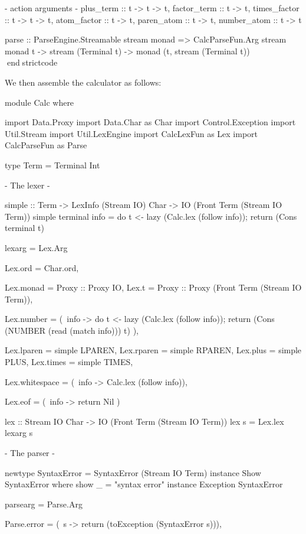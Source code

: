 \documentclass[10pt]{article}
\begin{document}
\begin{strictcode}
\begin{strictcode}
\begin{strictcode}
\begin{strictcode}
\begin{strictcode}
\begin{strictcode}
\begin{strictcode}
\begin{strictcode}
\begin{strictcode}
\begin{bigstrictcode}
\begin{strictcode}
\begin{strictcode}
{         {- action arguments -}
         plus_term :: t -> t -> t,
         factor_term :: t -> t,
         times_factor :: t -> t -> t,
         atom_factor :: t -> t,
         paren_atom :: t -> t,
         number_atom :: t -> t }

parse :: ParseEngine.Streamable stream monad 
         => CalcParseFun.Arg stream monad t -> stream (Terminal t)
               -> monad (t, stream (Terminal t))
endstrictcode

We then assemble the calculator as follows:

\begin{bigstrictcode}
module Calc where

import Data.Proxy
import Data.Char as Char
import Control.Exception
import Util.Stream
import Util.LexEngine
import CalcLexFun as Lex
import CalcParseFun as Parse

type Term = Terminal Int


{- The lexer -}

simple :: Term -> LexInfo (Stream IO) Char -> IO (Front Term (Stream IO Term))
simple terminal info =
   do {
      t <- lazy (Calc.lex (follow info));
      return (Cons terminal t)
      }


lexarg =
   Lex.Arg
      {
      Lex.ord = Char.ord,

      Lex.monad = Proxy :: Proxy IO,
      Lex.t = Proxy :: Proxy (Front Term (Stream IO Term)),

      Lex.number =
         (\ info ->
             do {
                t <- lazy (Calc.lex (follow info));
                return (Cons (NUMBER (read (match info))) t)
                }),

      Lex.lparen = simple LPAREN,
      Lex.rparen = simple RPAREN,
      Lex.plus = simple PLUS,
      Lex.times = simple TIMES,

      Lex.whitespace =
         (\ info -> Calc.lex (follow info)),

      Lex.eof =
         (\ info -> return Nil )
      }


lex :: Stream IO Char -> IO (Front Term (Stream IO Term))
lex s = Lex.lex lexarg s


{- The parser -}

newtype SyntaxError = SyntaxError (Stream IO Term)
instance Show SyntaxError where
   show _ = "syntax error"
instance Exception SyntaxError


parsearg =
   Parse.Arg
      {
      Parse.error =
         (\ s -> return (toException (SyntaxError s))),

}
\end{bigstrictcode}
\end{strictcode}
\end{strictcode}
\end{bigstrictcode}
\end{strictcode}
\end{strictcode}
\end{strictcode}
\end{strictcode}
\end{strictcode}
\end{strictcode}
\end{strictcode}
\end{strictcode}
\end{strictcode}
\end{document}
